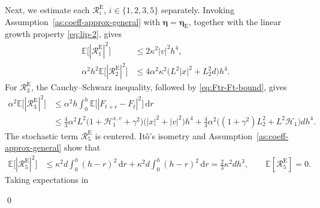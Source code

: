 \documentclass[12pt]{article}
\newenvironment{redtext}
  {\color{black}\ignorespaces}
  {\ignorespacesafterend}
\numberwithin{equation}{section}
\renewenvironment{proof}%
  {\begin{trivlist}%
   \item[]\ignorespaces}%
  {\qed\end{trivlist}}
\newcommand{\E}{\mathbb{E}}
\newcommand{\dd}{\mathrm{d}}
\begin{document}
\begin{redtext}
\begin{proof}
%
Next, we estimate each $\mathcal R_i^{\mathrm E}$, $i\in\{1,2,3,5\}$ separately.
Invoking Assumption~\ref{as:coeff-approx-general} with
$\boldsymbol{\eta}=\boldsymbol{\eta}_{\mathrm E}$, together with
the linear growth property \eqref{eq:lip-2}, gives
\begin{align}
\E\big[|\mathcal R_1^{\mathrm E}|^2\big]
&\leq
2\kappa^2|v|^2h^4,
\label{eq:Euler-R1-bound}
\\
\alpha^2h^2
\E\big[|\mathcal R_2^{\mathrm E}|^2\big]
&\leq
4\alpha^2\kappa^2
\big(
L^2|x|^2+L_2^2d
\big)h^4.
\label{eq:Euler-R2-bound}
\end{align}
For $\mathcal R_3^{\mathrm E}$, the Cauchy--Schwarz inequality,
followed by \eqref{eq:Ftr-Ft-bound}, gives
\begin{align}
\alpha^2
\E\big[|\mathcal R_3^{\mathrm E}|^2\big]
&\leq
\alpha^2h
\int_0^h
\E\big[|F_{t+r}-F_t|^2\big]\,\dd r
\nonumber\\
&\leq
\tfrac{4}{3}\alpha^2L^2
\big(
1+\mathscr H_1^{x,v}+\gamma^2
\big)
\big(
|x|^2+|v|^2
\big)h^4
+
\tfrac{4}{3}\alpha^2
\Big(
(1+\gamma^2)L_2^2
+
L^2\mathscr H_1
\Big)dh^4.
\label{eq:Euler-R3-bound}
\end{align}
The stochastic term $\mathcal R_5^{\mathrm E}$ is centered.
It\^o's isometry and
Assumption~\ref{as:coeff-approx-general} show that
\begin{align}
\E\big[|\mathcal R_5^{\mathrm E}|^2\big]
&\leq
\kappa^2d\int_0^h(h-r)^2\,\dd r
+
\kappa^2d\int_0^h(h-r)^2\,\dd r
=
\tfrac{2}{3}\kappa^2dh^3,
\qquad
\E[\mathcal R_5^{\mathrm E}]=0.
\label{eq:Euler-R5-bound}
\end{align}
Taking expectations in

\end{proof}
\end{redtext}
\end{document}
